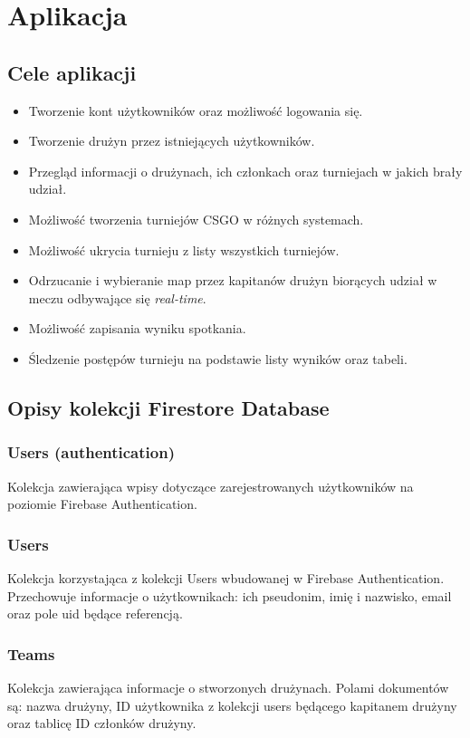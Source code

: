 \documentclass[shortabstract]{iithesis}
\theoremstyle{definition} \newtheorem{definition}{Definicja}[]
\theoremstyle{remark} \newtheorem{remark}[definition]{Observation}
\theoremstyle{plain} \newtheorem{theorem}[definition]{Theorem}
\theoremstyle{plain} \newtheorem{lemma}[definition]{Lemma}
\begin{document}
\chapter{Aplikacja}
\section{Cele aplikacji}

\begin{itemize}
    \item Tworzenie kont użytkowników oraz możliwość logowania się.
    \item Tworzenie drużyn przez istniejących użytkowników.
    \item Przegląd informacji o drużynach, ich członkach oraz turniejach w jakich brały udział.
    \item Możliwość tworzenia turniejów CSGO w różnych systemach.
    \item Możliwość ukrycia turnieju z listy wszystkich turniejów.
    \item Odrzucanie i wybieranie map przez kapitanów drużyn biorących udział w meczu odbywające się \textit{real-time}.
    \item Możliwość zapisania wyniku spotkania.
    \item Śledzenie postępów turnieju na podstawie listy wyników oraz tabeli.
\end{itemize}

\section{Opisy kolekcji Firestore Database}
\subsection{Users (authentication)}
Kolekcja zawierająca wpisy dotyczące zarejestrowanych użytkowników na poziomie Firebase Authentication.

\subsection{Users}
Kolekcja korzystająca z kolekcji Users wbudowanej w Firebase Authentication. Przechowuje informacje o użytkownikach: ich pseudonim, imię i nazwisko, email oraz pole uid będące referencją.

\subsection{Teams}
Kolekcja zawierająca informacje o stworzonych drużynach. Polami dokumentów są: nazwa drużyny, ID użytkownika z kolekcji users będącego kapitanem drużyny oraz tablicę ID członków drużyny.
\end{document}
